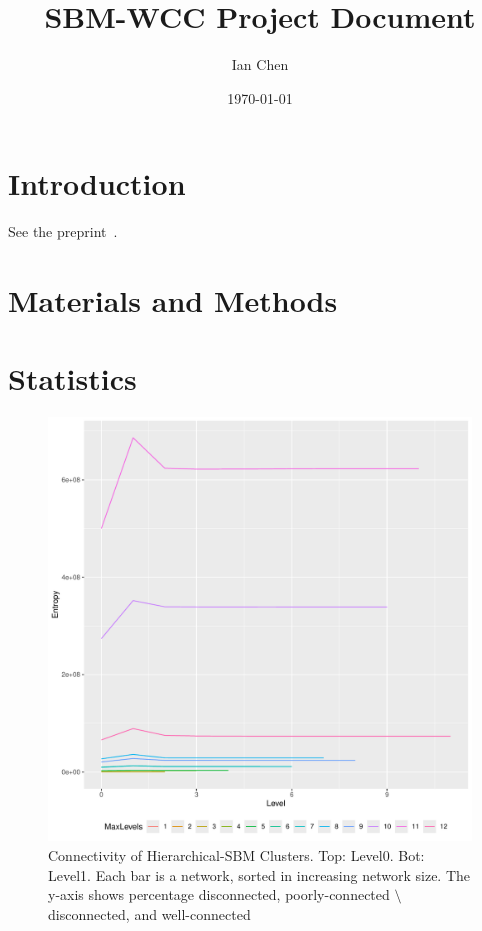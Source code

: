 \documentclass[aps,pre,superscriptaddress]{revtex4}
\begin{document}

\title{SBM-WCC Project Document}
\author{Ian Chen}
\date{\today}
\maketitle

\section{Introduction}
See the preprint~\cite{Park25-02}.

\section{Materials and Methods}

\section{Statistics}

\begin{figure}[ht]
	\includegraphics[width=\textwidth]{fig1.pdf}
	\caption{Connectivity of Hierarchical-SBM Clusters. Top: Level0. Bot: Level1.
		Each bar is a network, sorted in increasing network size.
		The y-axis shows percentage disconnected, poorly-connected $\setminus$ disconnected, and well-connected}
	\label{figs:fig1}
\end{figure}
\end{document}
